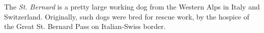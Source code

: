 The \emph{St.
    Bernard} is a pretty large working dog from the Western Alps in Italy and Switzerland.
Originally, such dogs were bred for rescue work, by the hospice of the Great St.
Bernard Pass on Italian-Swiss border.
